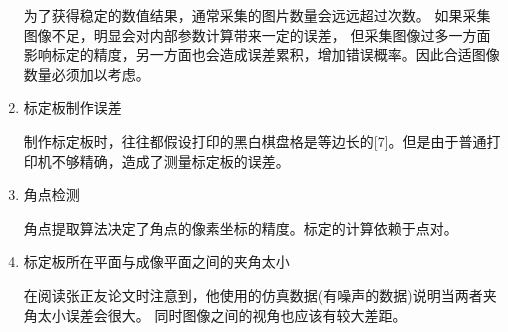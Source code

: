 \documentclass[10pt,a4paper]{article}
\begin{document}
\begin{CJK*}{UTF8}{gbsn}
\begin{enumerate}[(1)]
    为了获得稳定的数值结果，通常采集的图片数量会远远超过次数。
    如果采集图像不足，明显会对内部参数计算带来一定的误差，
    但采集图像过多一方面影响标定的精度，另一方面也会造成误差累积，增加错误概率。因此合适图像数量必须加以考虑。
    \item 标定板制作误差
    
    制作标定板时，往往都假设打印的黑白棋盘格是等边长的[7]。但是由于普通打印机不够精确，造成了测量标定板的误差。
    \item 角点检测
    
    角点提取算法决定了角点的像素坐标的精度。标定的计算依赖于点对。
    \item 标定板所在平面与成像平面之间的夹角太小
    
    在阅读张正友论文时注意到，他使用的仿真数据(有噪声的数据)说明当两者夹角太小误差会很大。
    同时图像之间的视角也应该有较大差距。
\end{enumerate}
\end{CJK*}
\end{document}
